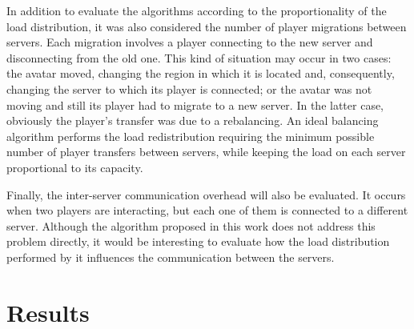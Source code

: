 \documentclass[acmjacm]{acmtrans2m}
\begin{document}
In addition to evaluate the algorithms according to the proportionality of the load distribution, it was also considered the number of player migrations between servers. Each migration involves a player connecting to the new server and disconnecting from the old one. This kind of situation may occur in two cases: the avatar moved, changing the region in which it is located and, consequently, changing the server to which its player is connected; or the avatar was not moving and still its player had to migrate to a new server. In the latter case, obviously the player's transfer was due to a rebalancing. An ideal balancing algorithm performs the load redistribution requiring the minimum possible number of player transfers between servers, while keeping the load on each server proportional to its capacity.

Finally, the inter-server communication overhead will also be evaluated. It occurs when two players are interacting, but each one of them is connected to a different server. Although the algorithm proposed in this work does not address this problem directly, it would be interesting to evaluate how the load distribution performed by it influences the communication between the servers.

\section{Results}
\label{sec:result}
\end{document}

